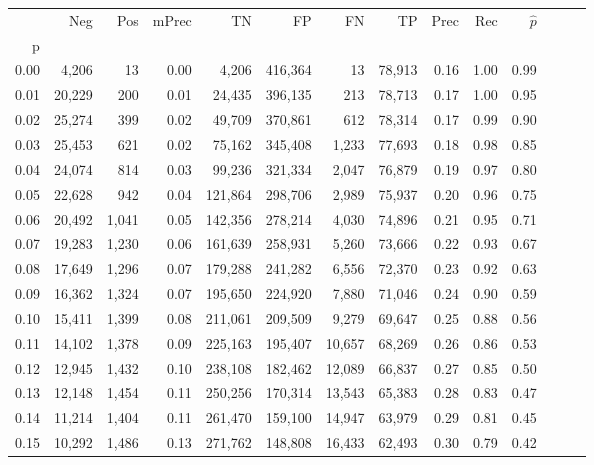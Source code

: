 \begin{tabular}{rrrrrrrrrrrrrr}
\toprule
{} &     Neg &    Pos & mPrec &       TN &       FP &      FN &      TP &  Prec &   Rec & $\hat{p}$ \\
p    &         &        &       &          &          &         &         &       &       &           \\
\midrule
0.00 &   4,206 &     13 &  0.00 &    4,206 &  416,364 &      13 &  78,913 &  0.16 &  1.00 &      0.99 \\
0.01 &  20,229 &    200 &  0.01 &   24,435 &  396,135 &     213 &  78,713 &  0.17 &  1.00 &      0.95 \\
0.02 &  25,274 &    399 &  0.02 &   49,709 &  370,861 &     612 &  78,314 &  0.17 &  0.99 &      0.90 \\
0.03 &  25,453 &    621 &  0.02 &   75,162 &  345,408 &   1,233 &  77,693 &  0.18 &  0.98 &      0.85 \\
0.04 &  24,074 &    814 &  0.03 &   99,236 &  321,334 &   2,047 &  76,879 &  0.19 &  0.97 &      0.80 \\
0.05 &  22,628 &    942 &  0.04 &  121,864 &  298,706 &   2,989 &  75,937 &  0.20 &  0.96 &      0.75 \\
0.06 &  20,492 &  1,041 &  0.05 &  142,356 &  278,214 &   4,030 &  74,896 &  0.21 &  0.95 &      0.71 \\
0.07 &  19,283 &  1,230 &  0.06 &  161,639 &  258,931 &   5,260 &  73,666 &  0.22 &  0.93 &      0.67 \\
0.08 &  17,649 &  1,296 &  0.07 &  179,288 &  241,282 &   6,556 &  72,370 &  0.23 &  0.92 &      0.63 \\
0.09 &  16,362 &  1,324 &  0.07 &  195,650 &  224,920 &   7,880 &  71,046 &  0.24 &  0.90 &      0.59 \\
0.10 &  15,411 &  1,399 &  0.08 &  211,061 &  209,509 &   9,279 &  69,647 &  0.25 &  0.88 &      0.56 \\
0.11 &  14,102 &  1,378 &  0.09 &  225,163 &  195,407 &  10,657 &  68,269 &  0.26 &  0.86 &      0.53 \\
0.12 &  12,945 &  1,432 &  0.10 &  238,108 &  182,462 &  12,089 &  66,837 &  0.27 &  0.85 &      0.50 \\
0.13 &  12,148 &  1,454 &  0.11 &  250,256 &  170,314 &  13,543 &  65,383 &  0.28 &  0.83 &      0.47 \\
0.14 &  11,214 &  1,404 &  0.11 &  261,470 &  159,100 &  14,947 &  63,979 &  0.29 &  0.81 &      0.45 \\
0.15 &  10,292 &  1,486 &  0.13 &  271,762 &  148,808 &  16,433 &  62,493 &  0.30 &  0.79 &      0.42 \\

\end{tabular}
